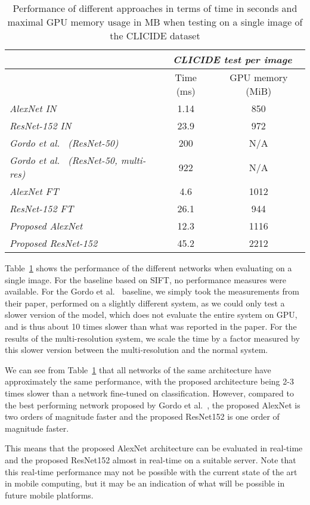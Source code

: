 \begin{table}
\begin{tabular}{|l|c|c|}
\hline & \multicolumn{2}{c|}{\emph{CLICIDE test per image}}\\
\hline & Time (ms) & GPU memory (MiB)\\
\hline \emph{AlexNet IN} & 1.14 & 850\\
\hline \emph{ResNet-152 IN} & 23.9 & 972\\
\hline \emph{Gordo et al.~\cite{gordo_deep_2016} (ResNet-50)} & 200 & N/A\\
\hline \emph{Gordo et al.~\cite{gordo_deep_2016} (ResNet-50, multi-res)}
& 922 & N/A\\
\hline \emph{AlexNet FT} & 4.6 & 1012\\
\hline \emph{ResNet-152 FT} & 26.1 & 944\\
\hline \emph{Proposed AlexNet} & 12.3 & 1116\\
\hline \emph{Proposed ResNet-152} & 45.2 & 2212\\
\hline
\end{tabular}
\caption{Performance of different approaches in terms of time in seconds and
maximal GPU memory usage in MB when testing on a single image
of the CLICIDE dataset\label{tab:perftest}}
\end{table}

Table~\ref{tab:perftest} shows the performance of the different networks
when evaluating on a single image. For the baseline based on SIFT, no performance measures were available.
For the Gordo et al.~\cite{gordo_deep_2016} baseline, we simply took the
measurements from their paper, performed on a slightly different system,
as we could only test a slower version of the model, which does not
evaluate the entire system on GPU, and is thus about 10 times slower than
what was reported in the paper.
For the results of the multi-resolution system, we scale the time
by a factor measured by this slower version between the multi-resolution
and the normal system.

We can see from Table~\ref{tab:perftest} that all networks
of the same architecture have approximately the same performance, with
the proposed architecture being 2-3 times slower than a network
fine-tuned on classification. However, compared to the best performing
network proposed by Gordo et al.~\cite{gordo_deep_2016}, the proposed AlexNet
is two orders of magnitude faster and the proposed ResNet152 is one
order of magnitude faster.

This means that the proposed AlexNet architecture can be evaluated in
real-time and the proposed ResNet152 almost in real-time on a suitable
server.
Note that this real-time performance may not be possible with the current
state of the art in mobile computing, but it may be an indication of
what will be possible in future mobile platforms.

